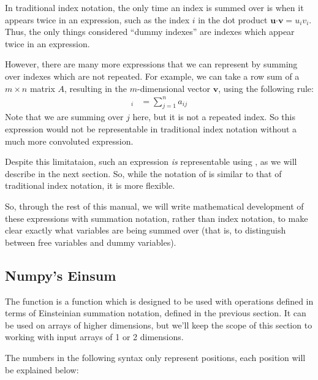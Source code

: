 \begin{info}
In traditional index notation, the only time an index is summed over is when it appears twice in an expression, such as the index $i$ in the dot product $\mathbf{u} \boldsymbol{\cdot} \mathbf{v} = u_i v_i$. Thus, the only things considered ``dummy indexes'' are indexes which appear twice in an expression.

\noindent However, there are many more expressions that we can represent by summing over indexes which are not repeated.
For example, we can take a row sum of a $m \times n$ matrix $A$, resulting in the $m$-dimensional vector $\mathbf{v}$, using the following rule:
\begin{align*}
	[v]_i &= \sum_{j=1}^{n} a_{ij}
\end{align*}
Note that we are summing over $j$ here, but it is not a repeated index.
So this expression would not be representable in traditional index notation without a much more convoluted expression.

\noindent Despite this limitataion, such an expression \emph{is} representable using , as we will describe in the next section.
So, while the notation of   is similar to that of traditional index notation, it is more flexible.

\noindent So, through the rest of this manual, we will write mathematical development of these expressions with summation notation, rather than index notation, to make clear exactly what variables are being summed over (that is, to distinguish between free variables and dummy variables).

\end{info}


\subsection*{Numpy's Einsum}

The function  is a function which is designed to be used with operations defined in terms of Einsteinian summation notation, defined in the previous section.
It can be used on arrays of higher dimensions, but we'll keep the scope of this section to working with input arrays of 1 or 2 dimensions.

The numbers in the following syntax only represent positions, each position will be explained below:

\begin{center}
\end{center}

